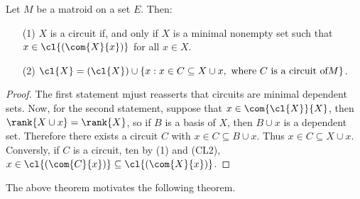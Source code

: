 \begin{theorem}\label{1.4.7}
    Let $M$ be a matroid on a set  $E$. Then:
    \begin{enumerate}
        \item[(1)] $X$ is a circuit if, and only if  $X$ is a minimal nonempty
            set such that  $x \in \cl{(\com{X}{x})}$ for all $x \in X$.

        \item[(2)] $\cl{X}=(\cl{X}) \cup \{x : x \in C \subseteq X \cup x,
            \text{ where } C \text{ is a circuit of} M\}$.
    \end{enumerate}
\end{theorem}
\begin{proof}
    The first statement mjust reasserts that circuits are minimal dependent
    sets. Now, for the second statement, suppose that $x \in \com{\cl{X}}{X}$,
    then $\rank{X \cup x}=\rank{X}$, so if $B$ is a basis of  $X$, then  $B \cup
    x$ is a dependent set. Therefore there exists a circuit  $C$ with  $x \in C
    \subseteq B \cup x$. Thus  $x \in C \subseteq X \cup x$. Conversly, if $C$
    is a circuit, ten by (1) and (CL2), $x \in \cl{(\com{C}{x})} \subseteq
    \cl{(\com{X}{x})}$.
\end{proof}

The above theorem motivates the following theorem.

